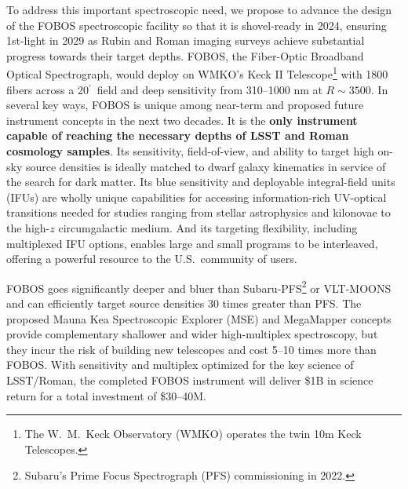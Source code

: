 \documentclass[oneside,11pt]{amsart}
\newcommand{\arcmin}{\mbox{$^{\prime}$}}
\DeclareRobustCommand{\gtrsim}{%
\mathrel{\hskip-.5em\begin{array}{c}>\\[-8pt]\sim\end{array}\hskip-.5em}}
\begin{document}

To address this important spectroscopic need, we propose to advance the design of the FOBOS spectroscopic facility so that it is shovel-ready in 2024, ensuring 1st-light in 2029 as Rubin and Roman imaging surveys achieve substantial progress towards their target depths.  FOBOS, the Fiber-Optic Broadband Optical Spectrograph, would deploy on WMKO's Keck II Telescope\footnote{The W.~M.\ Keck Observatory (WMKO) operates the twin 10m Keck Telescopes.} with 1800 fibers across a 20\arcmin\ field and deep sensitivity from 310--1000 nm at $R \sim 3500$.  In several key ways, FOBOS is unique among near-term and proposed future instrument concepts in the next two decades\citep{bundy19}.  It is the \textbf{only instrument capable of reaching the necessary depths of LSST and Roman cosmology samples}.  Its sensitivity, field-of-view, and ability to target high on-sky source densities is ideally matched to dwarf galaxy kinematics in service of the search for dark matter.  Its blue sensitivity and deployable integral-field units (IFUs) are wholly unique capabilities for accessing information-rich UV-optical transitions needed for studies ranging from stellar astrophysics and kilonovae to the high-$z$ circumgalactic medium.  And its targeting flexibility, including multiplexed IFU options, enables large and small programs to be interleaved, offering a powerful resource to the U.S.\ community of users.

FOBOS goes significantly deeper and bluer than Subaru-PFS\footnote{Subaru's Prime Focus Spectrograph (PFS) commissioning in 2022.} or VLT-MOONS and can efficiently target source densities 30 times greater than PFS.  The proposed Mauna Kea Spectroscopic Explorer (MSE) and MegaMapper concepts provide complementary shallower and wider high-multiplex spectroscopy, but they incur the risk of building new telescopes and cost 5--10 times more than FOBOS.  With sensitivity and multiplex optimized for the key science of LSST/Roman, the completed FOBOS instrument will deliver \$1B in science return for a total investment of \$30--40M.




\end{document}

